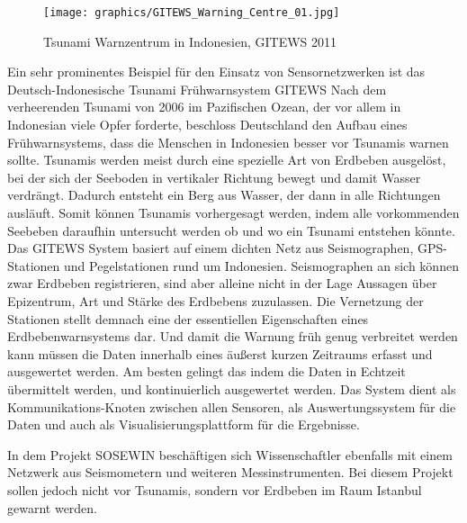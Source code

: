 \begin{wrapfigure}{r}{0.5\textwidth}
  \begin{center}
 	 \texttt{[image: graphics/GITEWS\_Warning\_Centre\_01.jpg]} 
	\caption{Tsunami Warnzentrum in Indonesien, GITEWS 2011}
  \end{center}
\end{wrapfigure}
Ein sehr prominentes Beispiel für den Einsatz von Sensornetzwerken ist das Deutsch-Indonesische Tsunami Frühwarnsystem  \gls{GITEWS} Nach dem verheerenden Tsunami von 2006 im Pazifischen Ozean, der vor allem in Indonesian viele Opfer forderte, beschloss Deutschland den Aufbau eines Frühwarnsystems, dass die Menschen in Indonesien besser vor Tsunamis warnen sollte. 
Tsunamis werden meist durch eine spezielle Art von Erdbeben ausgelöst, bei der sich der Seeboden in vertikaler Richtung bewegt und damit Wasser verdrängt. Dadurch entsteht ein Berg aus Wasser, der dann in alle Richtungen ausläuft. Somit können Tsunamis vorhergesagt werden, indem alle vorkommenden Seebeben daraufhin untersucht werden ob und wo ein Tsunami entstehen könnte. Das \gls{GITEWS} System basiert auf einem dichten Netz aus Seismographen,  GPS-Stationen und Pegelstationen rund um Indonesien. Seismographen an sich können zwar Erdbeben registrieren, sind aber alleine nicht in der Lage Aussagen über Epizentrum, Art und Stärke des Erdbebens zuzulassen. Die Vernetzung der Stationen stellt demnach eine der essentiellen Eigenschaften eines Erdbebenwarnsystems dar. Und damit die Warnung früh genug verbreitet werden kann müssen die Daten innerhalb eines äußerst kurzen Zeitraums erfasst und ausgewertet werden. Am besten gelingt das indem die Daten in Echtzeit übermittelt werden, und kontinuierlich ausgewertet werden. Das System dient als Kommunikations-Knoten zwischen allen Sensoren, als Auswertungssystem für die Daten und auch als Visualisierungsplattform für die Ergebnisse. \citep{lauterjung_gitewstsunami-fruhwarnsystem_2011} \citep{strobl_geodatenmanagement_2007} \citep{spahn_experience_2010}

In dem Projekt \gls{SOSEWIN} beschäftigen sich Wissenschaftler ebenfalls mit einem Netzwerk aus Seismometern und weiteren Messinstrumenten. Bei diesem Projekt sollen jedoch nicht vor Tsunamis, sondern vor Erdbeben im Raum Istanbul gewarnt werden. 

